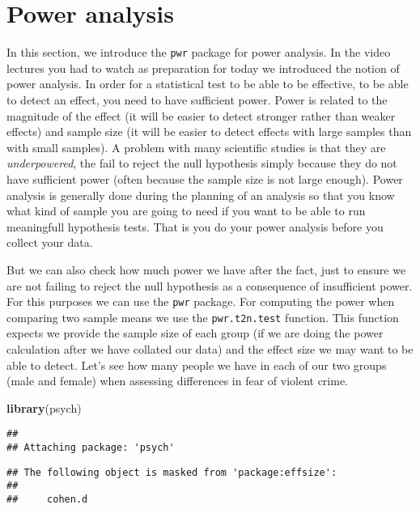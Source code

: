 \documentclass[
]{book}
\newenvironment{Shaded}{\begin{snugshade}}{\end{snugshade}}
\newcommand{\FunctionTok}[1]{\textcolor[rgb]{0.13,0.29,0.53}{\textbf{#1}}}
\newcommand{\NormalTok}[1]{#1}
\begin{document}
\section{Power analysis}\label{power-analysis}

In this section, we introduce the \texttt{pwr} package for power analysis. In the video lectures you had to watch as preparation for today we introduced the notion of power analysis. In order for a statistical test to be able to be effective, to be able to detect an effect, you need to have sufficient power. Power is related to the magnitude of the effect (it will be easier to detect stronger rather than weaker effects) and sample size (it will be easier to detect effects with large samples than with small samples). A problem with many scientific studies is that they are \emph{underpowered}, the fail to reject the null hypothesis simply because they do not have sufficient power (often because the sample size is not large enough). Power analysis is generally done during the planning of an analysis so that you know what kind of sample you are going to need if you want to be able to run meaningfull hypothesis tests. That is you do your power analysis before you collect your data.

But we can also check how much power we have after the fact, just to ensure we are not failing to reject the null hypothesis as a consequence of insufficient power. For this purposes we can use the \texttt{pwr} package. For computing the power when comparing two sample means we use the \texttt{pwr.t2n.test} function. This function expects we provide the sample size of each group (if we are doing the power calculation after we have collated our data) and the effect size we may want to be able to detect. Let's see how many people we have in each of our two groups (male and female) when assessing differences in fear of violent crime.

\begin{Shaded}
\begin{Highlighting}[]
\FunctionTok{library}\NormalTok{(psych)}
\end{Highlighting}
\end{Shaded}

\begin{verbatim}
## 
## Attaching package: 'psych'
\end{verbatim}

\begin{verbatim}
## The following object is masked from 'package:effsize':
## 
##     cohen.d
\end{verbatim}
\end{document}
